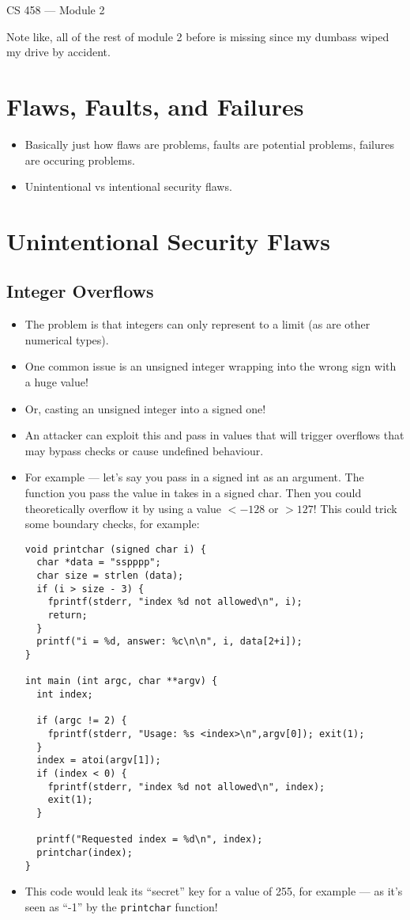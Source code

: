 \documentclass{article}
\author{Clement Tsang}
\begin{document}
\begin{center}
    \Large{CS 458 --- Module 2}
\end{center}

Note like, all of the rest of module 2 before is missing since my dumbass wiped my drive by accident.

\section{Flaws, Faults, and Failures}
\begin{itemize}
    \item Basically just how flaws are problems, faults are potential problems, failures are occuring problems.
    \item Unintentional vs intentional security flaws.
\end{itemize}

\section{Unintentional Security Flaws}

\subsection{Integer Overflows}
\begin{itemize}
    \item The problem is that integers can only represent to a limit (as are other numerical types).
    \item One common issue is an unsigned integer wrapping into the wrong sign with a huge value!
    \item Or, casting an unsigned integer into a signed one!
    \item An attacker can exploit this and pass in values that will trigger overflows that may bypass checks or cause undefined behaviour.
    \item For example --- let's say you pass in a signed int as an argument.  The function you pass the value in takes in a signed char.  Then you could theoretically overflow it by using a value $< -128$ or $> 127$!  This could trick some boundary checks, for example:
\begin{lstlisting}
void printchar (signed char i) {
  char *data = "sspppp";
  char size = strlen (data);
  if (i > size - 3) {
	fprintf(stderr, "index %d not allowed\n", i);
	return;
  }
  printf("i = %d, answer: %c\n\n", i, data[2+i]);
}

int main (int argc, char **argv) {
  int index;

  if (argc != 2) {
    fprintf(stderr, "Usage: %s <index>\n",argv[0]); exit(1);
  }
  index = atoi(argv[1]);
  if (index < 0) {
	fprintf(stderr, "index %d not allowed\n", index);
	exit(1);
  }

  printf("Requested index = %d\n", index);
  printchar(index);
}
\end{lstlisting}
    \item This code would leak its ``secret'' key for a value of 255, for example --- as it's seen as ``-1'' by the \lstinline{printchar} function!
\end{itemize}
\end{document}
